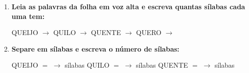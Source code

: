 \begin{exercicio}
\begin{enumerate}[resume]
  \item \textbf{Leia as palavras da folha em voz alta e escreva quantas sílabas cada uma tem:}

  \begin{center}
  QUEIJO $\rightarrow$ \underline{\hspace{1cm}} \quad QUILO $\rightarrow$ \underline{\hspace{1cm}} \quad QUENTE $\rightarrow$ \underline{\hspace{1cm}} \quad QUERO $\rightarrow$ \underline{\hspace{1cm}}
  \end{center}

  \item \textbf{Separe em sílabas e escreva o número de sílabas:}
  \begin{center}
  QUEIJO $=$ \underline{\hspace{1.2cm}} $\rightarrow$ \underline{\hspace{0.8cm}} sílabas \quad QUILO $=$ \underline{\hspace{1.2cm}} $\rightarrow$ \underline{\hspace{0.8cm}} sílabas \quad QUENTE $=$ \underline{\hspace{1.2cm}} $\rightarrow$ \underline{\hspace{0.8cm}} sílabas
  \end{center}

\end{enumerate}

\end{exercicio}




